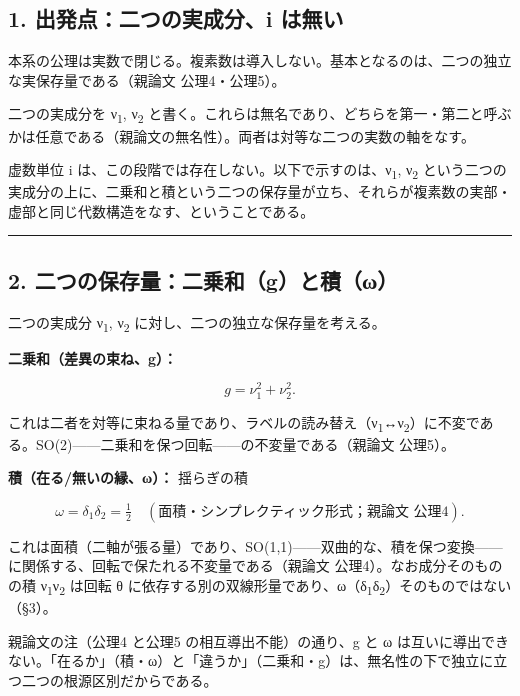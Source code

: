 \documentclass[11pt]{ltjsarticle}
\begin{document}
\subsection{1. 出発点：二つの実成分、i
は無い}\label{ux51faux767aux70b9ux4e8cux3064ux306eux5b9fux6210ux5206i-ux306fux7121ux3044}

本系の公理は実数で閉じる。複素数は導入しない。基本となるのは、二つの独立な実保存量である（親論文
公理4・公理5）。

二つの実成分を ν\textsubscript{1}, ν\textsubscript{2}
と書く。これらは無名であり、どちらを第一・第二と呼ぶかは任意である（親論文の無名性）。両者は対等な二つの実数の軸をなす。

虚数単位 i は、この段階では存在しない。以下で示すのは、ν\textsubscript{1}, ν\textsubscript{2}
という二つの実成分の上に、二乗和と積という二つの保存量が立ち、それらが複素数の実部・虚部と同じ代数構造をなす、ということである。

\begin{center}\rule{0.5\linewidth}{0.5pt}\end{center}

\subsection{2.
二つの保存量：二乗和（g）と積（ω）}\label{ux4e8cux3064ux306eux4fddux5b58ux91cfux4e8cux4e57ux548cgux3068ux7a4dux3c9}

二つの実成分 ν\textsubscript{1}, ν\textsubscript{2} に対し、二つの独立な保存量を考える。

\textbf{二乗和（差異の束ね、g）：}

\[g = \nu_1^2 + \nu_2^2.\]

これは二者を対等に束ねる量であり、ラベルの読み替え（ν\textsubscript{1}↔ν\textsubscript{2}）に不変である。SO(2)------二乗和を保つ回転------の不変量である（親論文
公理5）。

\textbf{積（在る/無いの縁、ω）：} 揺らぎの積

\[\omega = \delta_1\delta_2 = \tfrac{1}{2} \quad(\text{面積・シンプレクティック形式；親論文 公理4}).\]

これは面積（二軸が張る量）であり、SO(1,1)------双曲的な、積を保つ変換------に関係する、回転で保たれる不変量である（親論文
公理4）。なお成分そのものの積 ν\textsubscript{1}ν\textsubscript{2} は回転 θ
に依存する別の双線形量であり、ω（δ\textsubscript{1}δ\textsubscript{2}）そのものではない（§3）。

親論文の注（公理4 と公理5 の相互導出不能）の通り、g と ω
は互いに導出できない。「在るか」（積・ω）と「違うか」（二乗和・g）は、無名性の下で独立に立つ二つの根源区別だからである。
\end{document}
